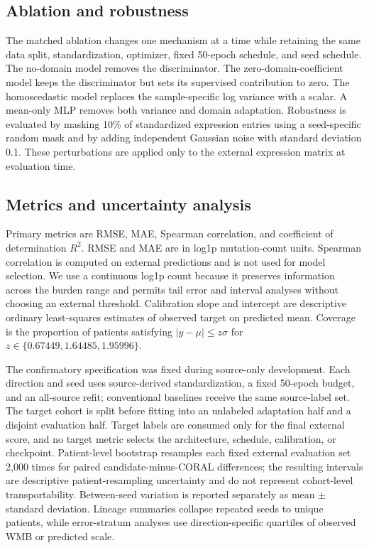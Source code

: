 \documentclass[11pt]{article}
\begin{document}
\subsection{Ablation and robustness}
The matched ablation changes one mechanism at a time while retaining the same data split, standardization, optimizer, fixed 50-epoch schedule, and seed schedule. The no-domain model removes the discriminator. The zero-domain-coefficient model keeps the discriminator but sets its supervised contribution to zero. The homoscedastic model replaces the sample-specific log variance with a scalar. A mean-only MLP removes both variance and domain adaptation. Robustness is evaluated by masking 10\% of standardized expression entries using a seed-specific random mask and by adding independent Gaussian noise with standard deviation 0.1. These perturbations are applied only to the external expression matrix at evaluation time.

\subsection{Metrics and uncertainty analysis}
Primary metrics are RMSE, MAE, Spearman correlation, and coefficient of determination $R^2$. RMSE and MAE are in log1p mutation-count units. Spearman correlation is computed on external predictions and is not used for model selection. We use a continuous log1p count because it preserves information across the burden range and permits tail error and interval analyses without choosing an external threshold. Calibration slope and intercept are descriptive ordinary least-squares estimates of observed target on predicted mean. Coverage is the proportion of patients satisfying $|y-\mu|\le z\sigma$ for $z\in\{0.67449,1.64485,1.95996\}$.

The confirmatory specification was fixed during source-only development. Each direction and seed uses source-derived standardization, a fixed 50-epoch budget, and an all-source refit; conventional baselines receive the same source-label set. The target cohort is split before fitting into an unlabeled adaptation half and a disjoint evaluation half. Target labels are consumed only for the final external score, and no target metric selects the architecture, schedule, calibration, or checkpoint. Patient-level bootstrap resamples each fixed external evaluation set 2,000 times for paired candidate-minus-CORAL differences; the resulting intervals are descriptive patient-resampling uncertainty and do not represent cohort-level transportability. Between-seed variation is reported separately as mean $\pm$ standard deviation. Lineage summaries collapse repeated seeds to unique patients, while error-stratum analyses use direction-specific quartiles of observed WMB or predicted scale.
\end{document}

